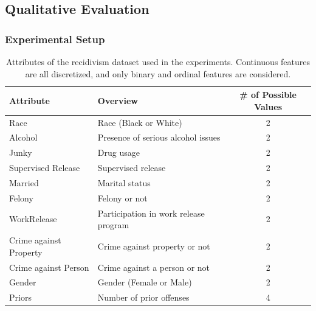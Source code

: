 \documentclass[11pt]{article}
\begin{document}
\subsection{Qualitative Evaluation}
\subsubsection{Experimental Setup}\label{sec:exp_setting}
{%
	\renewcommand{\arraystretch}{1.05}
	\begin{table}[tbp]
		\centering
		\caption[Attributes of the recidivism dataset used in the experiments]{%
			Attributes of the recidivism dataset used in the experiments.
			Continuous features are all discretized,
			and only binary and ordinal features are considered.
		}\label{tab:rcdv}
		\ifnum{}
			\small
		\fi
		\begin{tabular}{llc}
			\toprule
			Attribute              & Overview                              & \# of \ifnum\mode=1 Possible \fi Values \\
			\midrule
			Race                   & Race (Black or White)                 & 2                                       \\
			Alcohol                & Presence of serious alcohol issues    & 2                                       \\
			Junky                  & Drug usage                            & 2                                       \\
			Supervised Release     & Supervised release                    & 2                                       \\
			Married                & Marital status                        & 2                                       \\
			Felony                 & Felony or not                         & 2                                       \\
			WorkRelease            & Participation in work release program & 2                                       \\
			Crime against Property & Crime against property or not         & 2                                       \\
			Crime against Person   & Crime against a person or not         & 2                                       \\
			Gender                 & Gender (Female or Male)               & 2                                       \\
			Priors                 & Number of prior offenses              & 4                                       \\

\end{tabular}
\end{table}}
\end{document}

